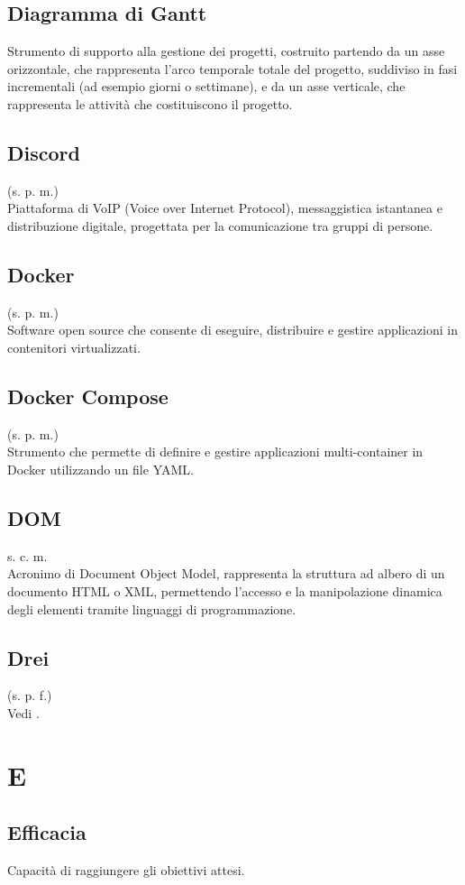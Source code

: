 \subsection{Diagramma di Gantt}
Strumento di supporto alla gestione dei progetti, costruito partendo da un asse
orizzontale, che rappresenta l'arco temporale totale del progetto, suddiviso in
fasi incrementali (ad esempio giorni o settimane), e da un asse verticale, che
rappresenta le attività che costituiscono il progetto.
\subsection{Discord}
(s. p. m.)\\
Piattaforma di VoIP (Voice over Internet Protocol), messaggistica istantanea
e distribuzione digitale, progettata per la comunicazione tra gruppi di persone.
\subsection{Docker}
(s. p. m.)\\
Software open source che consente di eseguire, distribuire e gestire
applicazioni in contenitori virtualizzati.
\subsection{Docker Compose}
(s. p. m.)\\
Strumento che permette di definire e gestire applicazioni multi-container in Docker
utilizzando un file YAML.
\subsection{DOM}
{s. c. m.}\\
Acronimo di Document Object Model, rappresenta la struttura ad albero di un documento
HTML o XML, permettendo l'accesso e la manipolazione dinamica degli elementi tramite linguaggi
di programmazione.
\subsection{Drei}
(s. p. f.)\\
Vedi .
\pagebreak
\section{E}
\subsection{Efficacia}
Capacità di raggiungere gli obiettivi attesi.
